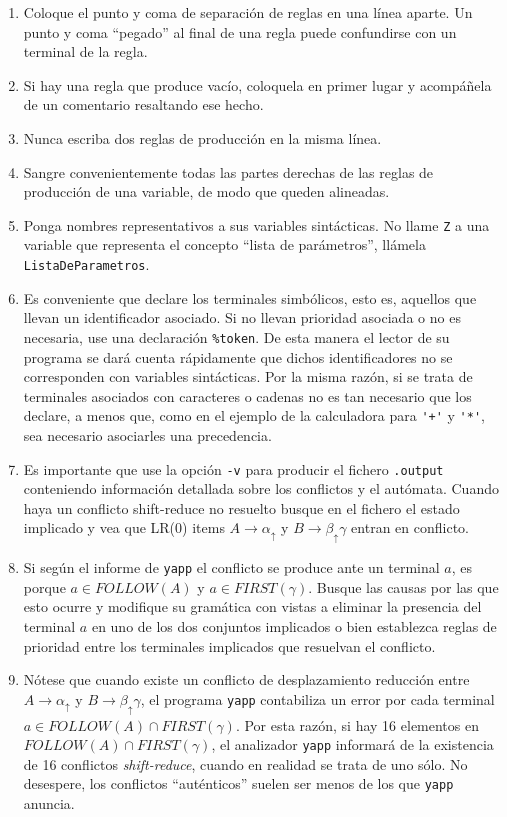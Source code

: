\begin{enumerate}
\item
Coloque el punto y coma de separación de reglas en una línea aparte.
Un punto y coma ``pegado'' al final de una regla puede confundirse
con un terminal de la regla.

\item
Si hay una regla que produce vacío, coloquela en primer lugar y acompáñela de 
un comentario resaltando ese hecho.
\item
Nunca escriba dos reglas de producción en la misma línea.
\item
Sangre convenientemente todas las partes derechas de las reglas
de producción de una variable, de modo que queden
alineadas.
\item
Ponga nombres representativos a sus variables sintácticas. No llame 
\verb|Z| a una variable que representa el concepto ``lista de parámetros'',
llámela \verb|ListaDeParametros|.
\item
Es conveniente que declare los terminales simbólicos, esto es, aquellos que 
llevan un identificador asociado. Si no llevan prioridad asociada o no 
es necesaria, use una declaración \verb|%token|. De esta manera
el lector de su programa se dará cuenta rápidamente que dichos identificadores
no se corresponden con variables sintácticas. Por la misma razón,
si se trata de terminales
asociados con caracteres o cadenas no es tan necesario que los declare, 
a menos que, 
como en el ejemplo de la calculadora para \verb|'+'| y \verb|'*'|,
sea necesario asociarles una
precedencia.
\item
Es importante que use la opción \verb|-v| para producir
el fichero \verb|.output| conteniendo información detallada sobre
los conflictos y el autómata. Cuando haya un conflicto shift-reduce
no resuelto busque en el fichero el estado implicado y 
vea que LR(0) items $A \rightarrow \alpha_\uparrow$
y $B \rightarrow \beta_\uparrow \gamma$ entran en conflicto.

\item
\label{item:conflictos}
Si según el informe de \verb|yapp|
el conflicto se produce ante un terminal $a$,
es porque $a \in FOLLOW(A)$ y
$a \in FIRST(\gamma)$. Busque las causas por las que esto ocurre 
y modifique su gramática con vistas a eliminar la presencia
del terminal $a$ en uno de los dos conjuntos implicados
o bien establezca reglas de prioridad entre los terminales
implicados que resuelvan el conflicto.

\item
Nótese que cuando existe un conflicto de desplazamiento 
reducción entre $A \rightarrow \alpha_\uparrow$ 
y  $B \rightarrow \beta_\uparrow \gamma$, el programa
\verb|yapp| contabiliza un error por cada terminal 
$a \in FOLLOW(A) \cap FIRST(\gamma)$. Por esta razón,
si hay 16 elementos en $FOLLOW(A) \cap FIRST(\gamma)$,
el analizador \verb|yapp| informará de la existencia
de 16 conflictos \emph{shift-reduce},
cuando en realidad se trata de uno sólo. No desespere, 
los conflictos ``auténticos'' suelen
ser menos de los que \verb|yapp| anuncia.


\end{enumerate}
